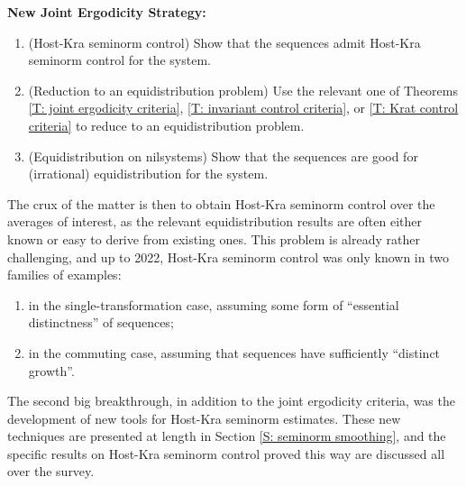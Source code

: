 \documentclass[11pt]{amsart}
\theoremstyle{definition}
\DeclareMathOperator*{\E}{\mathbb{E}}
\newcommand{\N}{{\mathbb N}}
\newcommand{\norm}[1]{\left\Vert #1\right\Vert}
\newcommand{\nnorm}[1]{\lvert\!|\!| #1|\!|\!\rvert}
\newcommand{\1}{{\mathbf{1}}}
\begin{document}
\textbf{New Joint Ergodicity Strategy:}
\begin{enumerate}
     \item (Host-Kra seminorm control) Show that the sequences admit Host-Kra seminorm control for the system.
    \item (Reduction to an equidistribution problem) Use the relevant one of Theorems \ref{T: joint ergodicity criteria}, \ref{T: invariant control criteria}, or \ref{T: Krat control criteria} to reduce to an equidistribution problem.
    \item (Equidistribution on nilsystems) Show that the sequences are good for (irrational) equidistribution for the system. 
\end{enumerate}
The crux of the matter is then to obtain Host-Kra seminorm control over the averages of interest, as the relevant equidistribution results are often either known or easy to derive from existing ones. This problem is already rather challenging, and up to 2022, Host-Kra seminorm control was only known in two families of examples:
\begin{enumerate}
    \item in the single-transformation case, assuming some form of ``essential distinctness'' of sequences;
    \item in the commuting case, assuming that sequences have sufficiently ``distinct growth''.
\end{enumerate}
The second big breakthrough, in addition to the joint ergodicity criteria, was the development of new tools for Host-Kra seminorm estimates. These new techniques are presented at length in Section \ref{S: seminorm smoothing}, and the specific results on Host-Kra seminorm control proved this way are discussed all over the survey.
\end{document}
